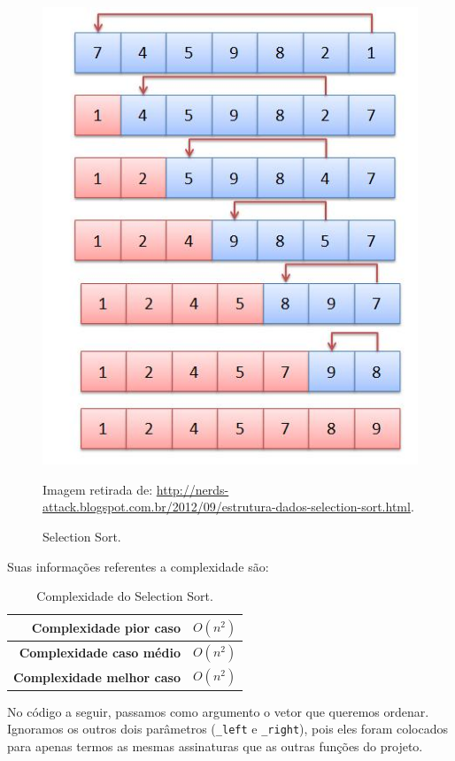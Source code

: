 \begin{figure}[H]
	\centering
	\includegraphics[scale=0.5]{img/selection-sort.jpg}
	\caption{Selection Sort.}
	\small{Imagem retirada de: \url{http://nerds-attack.blogspot.com.br/2012/09/estrutura-dados-selection-sort.html}.}
	\label{selection-sort}
\end{figure}

Suas informações referentes a complexidade são:

\begin{table}[H]
 \centering
	\begin{tabular}{| r | l |}
		\hline
		\textbf{Complexidade pior caso}   & $O(n^{2})$ \\
		\hline
		\textbf{Complexidade caso médio}  & $O(n^{2})$ \\
		\hline
		\textbf{Complexidade melhor caso} & $O(n^{2})$ \\
		\hline
	\end{tabular}
	\caption{Complexidade do Selection Sort.}
	\label{t_selection_sort}
\end{table}

No código a seguir, passamos como argumento o vetor que queremos ordenar. Ignoramos os outros dois parâmetros (\texttt{\_left} e \texttt{\_right}), pois eles foram colocados para apenas termos as mesmas assinaturas que as outras funções do projeto.

